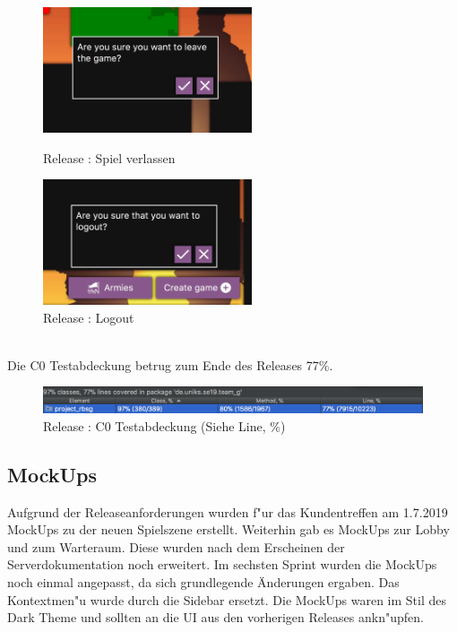 \documentclass[12pt, titlepage]{scrartcl}
\newcommand{\RN}[1]{%
	\textup{\uppercase\expandafter{\romannumeral#1}}%
}
\begin{document}
		        \begin{figure}[H]
                    \centering
                    \begin{minipage}{0.55\textwidth}
                        \centering
                        \includegraphics[width=0.55\textwidth]{images/old_state/additional/LeaveGame.png}
                        \caption{Release \RN{2}: Spiel verlassen}
                        \label{Leave_Game}
                    \end{minipage}%
                    \begin{minipage}{0.55\textwidth}
                        \centering
                        \includegraphics[width=0.55\textwidth]{images/old_state/additional/Logout.png}
                        \caption{Release \RN{2}: Logout}
                        \label{Logout}
                    \end{minipage}
                \end{figure}
                \ \\ Die C0 Testabdeckung betrug zum Ende des Releases \RN{2} 77\%.
                \begin{figure}[H] 
    				\centering
    				\includegraphics[width=\textwidth]{images/old_state/Coverage.png}
    				\caption{Release \RN{2}: C0 Testabdeckung (Siehe Line, \%)}
    				\label{Coverage}
			    \end{figure}
    \newpage
	    \subsection{MockUps}
	        Aufgrund der Releaseanforderungen wurden f"ur das Kundentreffen am 1.7.2019 MockUps zu der neuen Spielszene erstellt. Weiterhin gab es MockUps zur Lobby und zum Warteraum. Diese wurden nach dem Erscheinen der Serverdokumentation noch erweitert. Im sechsten Sprint wurden die MockUps noch einmal angepasst, da sich grundlegende \"Anderungen ergaben. Das Kontextmen"u wurde durch die Sidebar ersetzt. Die MockUps waren im Stil des Dark Theme und sollten an die UI aus den vorherigen Releases ankn"upfen.
\end{document}
